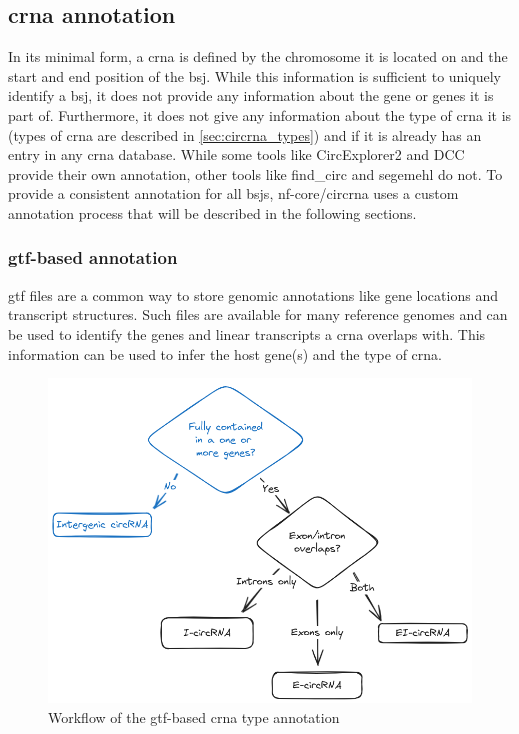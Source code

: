 \subsection{\gls{crna} annotation}
In its minimal form, a \gls{crna} is defined by the chromosome it is located on
and the start and end position of the \gls{bsj}.
While this information is sufficient to uniquely identify a \gls{bsj}, it does
not provide any information about the gene or genes it is part of.
Furthermore, it does not give any information about the type of \gls{crna} it
is (types of \gls{crna} are described in \cref{sec:circrna_types}) and if it is
already has an entry in any \gls{crna} database.
While some tools like CircExplorer2 and DCC provide their own annotation, other
tools like find\_circ and segemehl do not.
To provide a consistent annotation for all \glspl{bsj}, nf-core/circrna uses a
custom annotation process that will be described in the following sections.

\subsubsection{\gls{gtf}-based annotation}
\gls{gtf} files are a common way to store genomic annotations like gene
locations and
transcript structures.
Such files are available for many reference genomes and can be used to identify
the genes and linear transcripts a \gls{crna} overlaps with.
This information can be used to infer the host gene(s) and the type of
\gls{crna}.

\begin{figure}[ht]
    \centering

    \includegraphics[width=\textwidth]{chapters/3_materials_and_methods/figures/annotation.png}
    \caption{Workflow of the \gls{gtf}-based \gls{crna} type annotation}
    \label{fig:gtf_annotation}
\end{figure}

